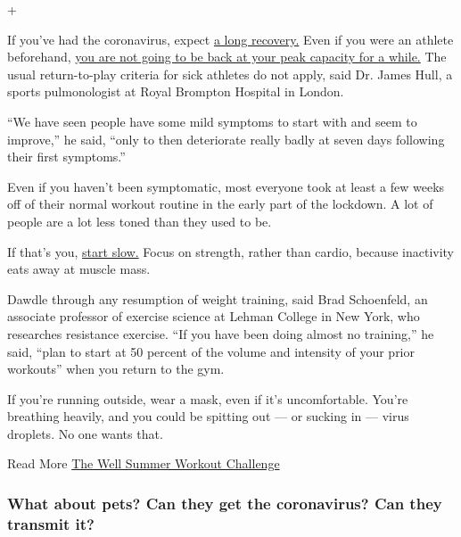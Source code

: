 +

If you've had the coronavirus, expect
\href{https://www.nytimes3xbfgragh.onion/2020/05/06/opinion/coronavirus-recovery.html}{a
long recovery.} Even if you were an athlete beforehand,
\href{https://www.nytimes3xbfgragh.onion/2020/05/20/well/returning-to-exercise-training-recovery-coronavirus.html}{you
are not going to be back at your peak capacity for a while.} The usual
return-to-play criteria for sick athletes do not apply, said Dr. James
Hull, a sports pulmonologist at Royal Brompton Hospital in London.

``We have seen people have some mild symptoms to start with and seem to
improve,'' he said, ``only to then deteriorate really badly at seven
days following their first symptoms.''

Even if you haven't been symptomatic, most everyone took at least a few
weeks off of their normal workout routine in the early part of the
lockdown. A lot of people are a lot less toned than they used to be.

If that's you,
\href{https://www.nytimes3xbfgragh.onion/2020/06/01/well/move/coronavirus-exercise-lockdown-quarantine-sports-weights-running-injuries.html}{start
slow.} Focus on strength, rather than cardio, because inactivity eats
away at muscle mass.

Dawdle through any resumption of weight training, said Brad Schoenfeld,
an associate professor of exercise science at Lehman College in New
York, who researches resistance exercise. ``If you have been doing
almost no training,'' he said, ``plan to start at 50 percent of the
volume and intensity of your prior workouts'' when you return to the
gym.

If you're running outside, wear a mask, even if it's uncomfortable.
You're breathing heavily, and you could be spitting out --- or sucking
in --- virus droplets. No one wants that.

 Read More
\href{https://www.nytimes3xbfgragh.onion/2020/07/02/well/move/the-well-summer-workout-challenge.html}{The
Well Summer Workout Challenge}

\hypertarget{what-about-pets-can-they-get-the-coronavirus-can-they-transmit-it}{%
\subsubsection{What about pets? Can they get the coronavirus? Can they
transmit
it?}\label{what-about-pets-can-they-get-the-coronavirus-can-they-transmit-it}}

